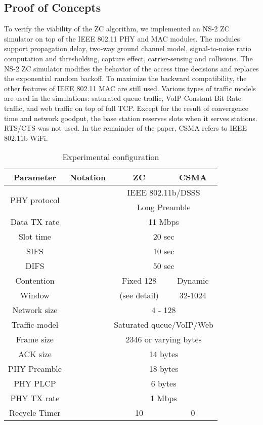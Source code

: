 \documentclass{acm_proc_article-sp}
\newcommand{\rt}{\xspace}
\newcommand{\m}{\xspace}
\begin{document}
\subsection{Proof of Concepts}
To verify the viability of the ZC algorithm, we implemented an NS-2 ZC simulator on top of the IEEE 802.11 PHY and MAC modules.
The modules support propagation delay, two-way ground channel model, signal-to-noise ratio computation and thresholding, capture effect, carrier-sensing
and collisions. The NS-2 ZC simulator modifies the behavior of the access time decisions and replaces the exponential random backoff.
To maximize the backward compatibility, the other features of IEEE 802.11 MAC are still used. Various types of traffic models are used in the simulations:
saturated queue traffic, VoIP Constant Bit Rate traffic, and web traffic on top of full TCP. Except for the result of convergence time and network goodput, the base station reserves  slots when it serves  stations. RTS/CTS was not used. In the remainder of the paper, CSMA refers to IEEE 802.11b WiFi.
\begin{table}[ht]
\small
    \centering \caption{Experimental configuration}
        \begin{tabular}{|c||c|c|c|}
\hline
        {\bf{Parameter}}&{\bf{Notation}}&{\bf{ZC}}   &{\bf{CSMA}}\\
        \hline
        \multirow{2}{*}{PHY protocol}& &\multicolumn{2}{|c|}{IEEE 802.11b/DSSS} \\
        &&\multicolumn{2}{|c|}{Long Preamble} \\
        \hline
        Data TX rate &&\multicolumn{2}{|c|}{11 Mbps}\\
        \hline
        Slot time    &&\multicolumn{2}{|c|}{20 sec}\\
        \hline
        SIFS&&\multicolumn{2}{|c|}{10 sec}\\
        \hline
        DIFS&&\multicolumn{2}{|c|}{50 sec}\\
        \hline
        Contention&\multirow{2}{*}{}&Fixed 128&Dynamic\\
        Window&& (see detail)& 32-1024\\
        \hline
        Network size&\m&\multicolumn{2}{|c|}{4 - 128}\\
        \hline
        Traffic model    &&\multicolumn{2}{|c|}{Saturated queue/VoIP/Web}\\
        \hline
        Frame size&&\multicolumn{2}{|c|}{2346 or varying bytes}\\
        \hline
        ACK size&&\multicolumn{2}{|c|}{14 bytes}\\
        \hline
        PHY Preamble& &\multicolumn{2}{|c|}{18 bytes}\\
        PHY PLCP&&\multicolumn{2}{|c|}{6 bytes}\\
        \hline
        PHY TX rate&&\multicolumn{2}{|c|}{1 Mbps}\\
        \hline
        Recycle Timer    &\rt&10         &0\\
        \hline
\end{tabular}
      \label{table.expconfig}
\end{table}
\end{document}
